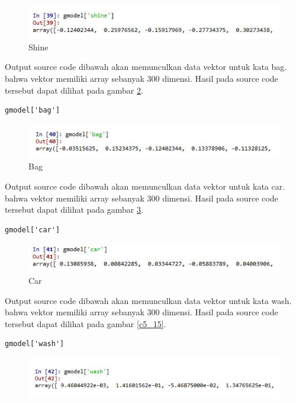 \begin{enumerate}
\begin{figure}[ht]
	\centerline{\includegraphics[width=1\textwidth]{figures/andi/E6.PNG}}
	\caption{Shine}
	\label{c5_12}
\end{figure}
\subitem Output source code dibawah akan memunculkan data vektor untuk kata bag. bahwa vektor memiliki array sebanyak 300 dimensi. Hasil pada source code tersebut dapat dilihat pada gambar \ref{c5_13}.
\begin{verbatim}
gmodel['bag']
\end{verbatim}
\begin{figure}[ht]
	\centerline{\includegraphics[width=1\textwidth]{figures/andi/E7.PNG}}
	\caption{Bag}
	\label{c5_13}
\end{figure}
\subitem Output source code dibawah akan memunculkan data vektor untuk kata car. bahwa vektor memiliki array sebanyak 300 dimensi. Hasil pada source code tersebut dapat dilihat pada gambar \ref{c5_14}.
\begin{verbatim}
gmodel['car']
\end{verbatim}
\begin{figure}[ht]
	\centerline{\includegraphics[width=1\textwidth]{figures/andi/E8.PNG}}
	\caption{Car}
	\label{c5_14}
\end{figure}
\subitem Output source code dibawah akan memunculkan data vektor untuk kata wash. bahwa vektor memiliki array sebanyak 300 dimensi. Hasil pada source code tersebut dapat dilihat pada gambar \ref{c5_15}.
\begin{verbatim}
gmodel['wash']
\end{verbatim}
\begin{figure}[ht]
	\centerline{\includegraphics[width=1\textwidth]{figures/andi/E9.PNG}}

\end{figure}
\end{enumerate}
